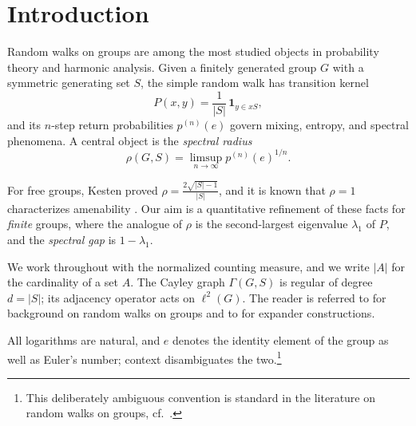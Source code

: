 \section{Introduction}
\label{sec:intro-body}

Random walks on groups are among the most studied objects in probability theory
and harmonic analysis. Given a finitely generated group $G$ with a symmetric
generating set $S$, the simple random walk has transition kernel
\begin{equation}
\label{eq:kernel}
P(x, y) = \frac{1}{|S|} \, \mathbf{1}_{y \in x S},
\end{equation}
and its $n$-step return probabilities $p^{(n)}(e)$ govern mixing, entropy, and
spectral phenomena. A central object is the \emph{spectral radius}
\begin{equation}
\label{eq:rho}
\rho(G, S) = \limsup_{n \to \infty} p^{(n)}(e)^{1/n}.
\end{equation}

For free groups, Kesten proved $\rho = \frac{2\sqrt{|S|-1}}{|S|}$, and it is
known that $\rho = 1$ characterizes amenability \cite{Kesten1959, Woess2000}.
Our aim is a quantitative refinement of these facts for \emph{finite} groups,
where the analogue of $\rho$ is the second-largest eigenvalue $\lambda_1$ of
$P$, and the \emph{spectral gap} is $1 - \lambda_1$.

We work throughout with the normalized counting measure, and we write
$|A|$ for the cardinality of a set $A$. The Cayley graph $\Gamma(G, S)$ is
regular of degree $d = |S|$; its adjacency operator acts on $\ell^2(G)$.
The reader is referred to \cite{Diaconis} for background on random walks on
groups and to \cite{Lubotzky} for expander constructions.

\begin{remark}[Notation]
\label{rem:notation}
All logarithms are natural, and $e$ denotes the identity element of the group
as well as Euler's number; context disambiguates the two.\footnote{This
deliberately ambiguous convention is standard in the literature on random
walks on groups, cf.\ \cite{Woess2000}.}
\end{remark}
